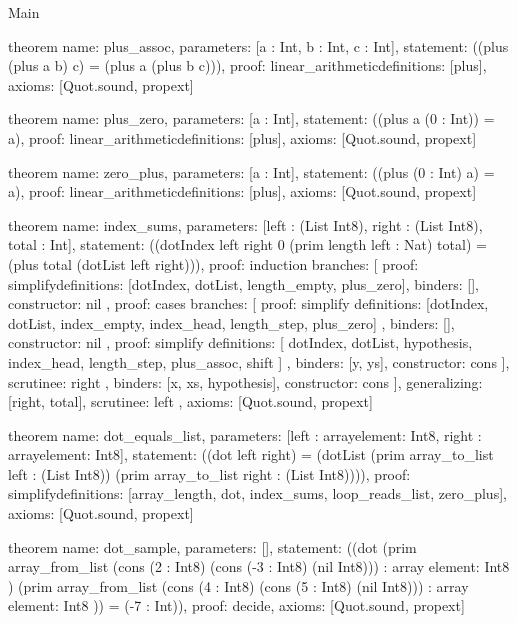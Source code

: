 \begin{lexlean}{Main}
\begin{semanticmodule}
theorem{
  name: plus_assoc,
  parameters: [a : Int, b : Int, c : Int],
  statement: ((plus (plus a b) c) = (plus a (plus b c))),
  proof: linear_arithmetic{definitions: [plus]},
  axioms: [Quot.sound, propext]
}

theorem{
  name: plus_zero,
  parameters: [a : Int],
  statement: ((plus a (0 : Int)) = a),
  proof: linear_arithmetic{definitions: [plus]},
  axioms: [Quot.sound, propext]
}

theorem{
  name: zero_plus,
  parameters: [a : Int],
  statement: ((plus (0 : Int) a) = a),
  proof: linear_arithmetic{definitions: [plus]},
  axioms: [Quot.sound, propext]
}

theorem{
  name: index_sums,
  parameters: [left : (List Int8), right : (List Int8), total : Int],
  statement: ((dotIndex left right 0 (prim length left : Nat) total) = (plus total (dotList left right))),
  proof: induction{
    branches: [
      {
        proof: simplify{definitions: [dotIndex, dotList, length_empty, plus_zero]},
        binders: [],
        constructor: nil
      },
      {
        proof: cases{
          branches: [
            {
              proof: simplify{
                definitions: [dotIndex, dotList, index_empty, index_head, length_step, plus_zero]
              },
              binders: [],
              constructor: nil
            },
            {
              proof: simplify{
                definitions: [
                  dotIndex,
                  dotList,
                  hypothesis,
                  index_head,
                  length_step,
                  plus_assoc,
                  shift
                ]
              },
              binders: [y, ys],
              constructor: cons
            }
          ],
          scrutinee: right
        },
        binders: [x, xs, hypothesis],
        constructor: cons
      }
    ],
    generalizing: [right, total],
    scrutinee: left
  },
  axioms: [Quot.sound, propext]
}

theorem{
  name: dot_equals_list,
  parameters: [left : array{element: Int8}, right : array{element: Int8}],
  statement: ((dot left right) = (dotList (prim array_to_list left : (List Int8)) (prim array_to_list right : (List Int8)))),
  proof: simplify{definitions: [array_length, dot, index_sums, loop_reads_list, zero_plus]},
  axioms: [Quot.sound, propext]
}

theorem{
  name: dot_sample,
  parameters: [],
  statement: ((dot (prim array_from_list (cons (2 : Int8) (cons (-3 : Int8) (nil Int8))) : array{
    element: Int8
  }) (prim array_from_list (cons (4 : Int8) (cons (5 : Int8) (nil Int8))) : array{
    element: Int8
  })) = (-7 : Int)),
  proof: decide{},
  axioms: [Quot.sound, propext]
}


\end{semanticmodule}
\end{lexlean}
